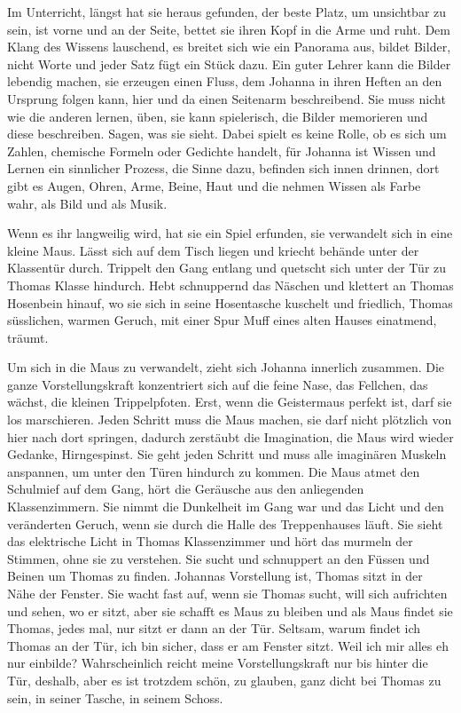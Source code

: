 \documentclass[10pt,a5paper]{book}
\begin{document}
Im Unterricht, längst hat sie heraus gefunden, der beste Platz, um unsichtbar zu sein, ist vorne und an der Seite, bettet sie ihren Kopf in die Arme und ruht. Dem Klang des Wissens lauschend, es breitet sich wie ein Panorama aus, bildet Bilder, nicht Worte und jeder Satz fügt ein Stück dazu. Ein guter Lehrer kann die Bilder lebendig machen, sie erzeugen einen Fluss, dem Johanna in ihren Heften an den Ursprung folgen kann, hier und da einen Seitenarm beschreibend. Sie muss nicht wie die anderen lernen, üben, sie kann spielerisch, die Bilder memorieren und diese beschreiben. Sagen, was sie sieht. Dabei spielt es keine Rolle, ob es sich um Zahlen, chemische Formeln oder Gedichte handelt, für Johanna ist Wissen und Lernen ein sinnlicher Prozess, die Sinne dazu, befinden sich innen drinnen, dort gibt es Augen, Ohren, Arme, Beine, Haut und die nehmen Wissen als Farbe wahr, als Bild  und als Musik.

Wenn es ihr langweilig wird, hat sie ein Spiel erfunden, sie verwandelt sich in eine kleine Maus. Lässt sich auf dem Tisch liegen und kriecht behände unter der Klassentür durch. Trippelt den Gang entlang und quetscht sich unter der Tür zu Thomas Klasse hindurch. Hebt schnuppernd das Näschen und klettert an Thomas Hosenbein hinauf, wo sie sich in seine Hosentasche kuschelt und friedlich, Thomas süsslichen, warmen Geruch, mit einer Spur Muff eines alten Hauses einatmend, träumt. 

Um sich in die Maus zu verwandelt, zieht sich Johanna innerlich zusammen. Die ganze Vorstellungskraft konzentriert sich auf die feine Nase, das Fellchen, das wächst, die kleinen Trippelpfoten. Erst, wenn die Geistermaus perfekt ist, darf sie los marschieren. Jeden Schritt muss die Maus machen, sie darf nicht plötzlich von hier nach dort springen, dadurch zerstäubt die Imagination, die Maus wird wieder Gedanke, Hirngespinst. Sie geht jeden Schritt und muss alle imaginären Muskeln anspannen, um unter den Türen hindurch zu kommen. Die Maus atmet den Schulmief auf dem Gang, hört die Geräusche aus den anliegenden Klassenzimmern. Sie nimmt die Dunkelheit im Gang war und das Licht und den veränderten Geruch, wenn sie durch die Halle des Treppenhauses läuft. Sie sieht das elektrische Licht in Thomas Klassenzimmer und hört das murmeln der Stimmen, ohne sie zu verstehen. Sie sucht und schnuppert an den Füssen und Beinen um Thomas zu finden. Johannas Vorstellung ist, Thomas sitzt in der Nähe der Fenster. Sie wacht fast auf, wenn sie Thomas sucht, will sich aufrichten und sehen, wo er sitzt, aber sie schafft es Maus zu bleiben und als Maus findet sie Thomas, jedes mal, nur sitzt er dann an der Tür. Seltsam, warum findet ich Thomas an der Tür, ich bin sicher, dass er am Fenster sitzt. Weil ich mir alles eh nur einbilde? Wahrscheinlich reicht meine Vorstellungskraft nur bis hinter die Tür, deshalb, aber es ist trotzdem schön, zu glauben, ganz dicht bei Thomas zu sein, in seiner Tasche, in seinem Schoss.
\end{document}

